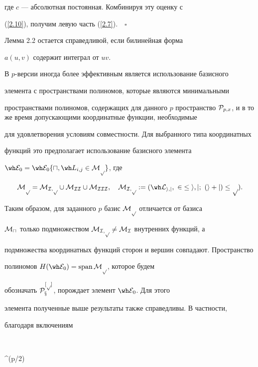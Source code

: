 где $c$ --- абсолютная постоянная. Комбинируя эту оценку с


(\ref{2.10}), получим левую часть (\ref{2.7}).$\quad\square$





\begin{notes}


Лемма 2.2 остается справедливой, если билинейная форма


$a(u,v)$ содержит интеграл от $uv$.


\end{notes}





\begin{notes}


В $p$-версии иногда более эффективным является использование базисного


элемента с пространствами полиномов, которые являются минимальными


пространствами полиномов, содержащих для данного $p$ пространство ${\cal


P}_{p,x}$, и в то же время допускающими координатные функции, необходимые


для удовлетворения условиям совместности. Для выбранного типа координатных


функций это предполагает использование базисного элемента


$\E_0=\E_0\{\sqcap,\hL\in\cal M_p\}$, где


$$


\m{p}=\m{I,p}\cup\m{II}\cup\m{III},\ \ \


\m{I,p}:=(\hL,\ 2\le i,j;\ (i+j)\le p).


$$


Таким образом, для заданного $p$ базис $\cal M_{p}$ отличается от базиса


$\cal M_{\sqcap}$ только подмножеством $\cal M_{I,p}\ne\cal M_{I}$ внутренних функций, а


подмножества координатных функций сторон и вершин совпадают. Пространство


полиномов $H(\E_0)=\Span\cal M_p$, которое будем


обозначать $\cal P^{[p]}_x$, порождает элемент $\E_0$. Для этого


элемента полученные выше результаты также справедливы. В частности,


благодаря включениям


$$


\m{\sqcap}^{(\lfloor p/2\rfloor)} \subset



\end{notes}
